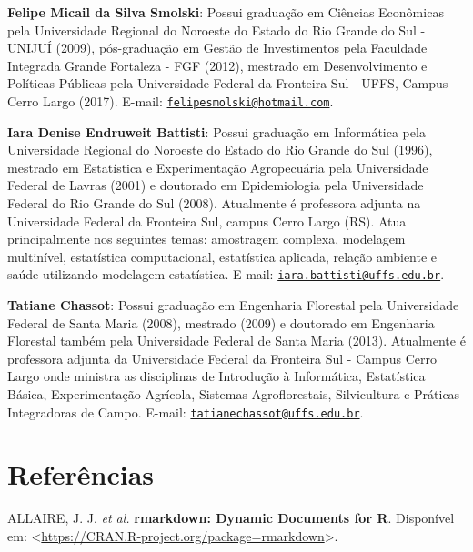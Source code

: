 \documentclass[12pt,brazil,oneside]{book}
\begin{document}
\textbf{Felipe Micail da Silva Smolski}: Possui graduação em Ciências Econômicas pela Universidade Regional do Noroeste do Estado do Rio Grande do Sul - UNIJUÍ (2009), pós-graduação em Gestão de Investimentos pela Faculdade Integrada Grande Fortaleza - FGF (2012), mestrado em Desenvolvimento e Políticas Públicas pela Universidade Federal da Fronteira Sul - UFFS, Campus Cerro Largo (2017). E-mail: \href{mailto:felipesmolski@hotmail.com}{\nolinkurl{felipesmolski@hotmail.com}}.

\textbf{Iara Denise Endruweit Battisti}: Possui graduação em Informática pela Universidade Regional do Noroeste do Estado do Rio Grande do Sul (1996), mestrado em Estatística e Experimentação Agropecuária pela Universidade Federal de Lavras (2001) e doutorado em Epidemiologia pela Universidade Federal do Rio Grande do Sul (2008). Atualmente é professora adjunta na Universidade Federal da Fronteira Sul, campus Cerro Largo (RS). Atua principalmente nos seguintes temas: amostragem complexa, modelagem multinível, estatística computacional, estatística aplicada, relação ambiente e saúde utilizando modelagem estatística. E-mail: \href{mailto:iara.battisti@uffs.edu.br}{\nolinkurl{iara.battisti@uffs.edu.br}}.

\textbf{Tatiane Chassot}: Possui graduação em Engenharia Florestal pela Universidade Federal de Santa Maria (2008), mestrado (2009) e doutorado em Engenharia Florestal também pela Universidade Federal de Santa Maria (2013). Atualmente é professora adjunta da Universidade Federal da Fronteira Sul - Campus Cerro Largo onde ministra as disciplinas de Introdução à Informática, Estatística Básica, Experimentação Agrícola, Sistemas Agroflorestais, Silvicultura e Práticas Integradoras de Campo. E-mail: \href{mailto:tatianechassot@uffs.edu.br}{\nolinkurl{tatianechassot@uffs.edu.br}}.

\setlength{\parindent}{0.0cm}

\RaggedRight

\frenchspacing

\hypertarget{referencias}{%
\chapter*{Referências}\label{referencias}}

\hypertarget{refs}{}
\leavevmode\hypertarget{ref-R-rmarkdown}{}%
ALLAIRE, J. J. \emph{et al.} \textbf{rmarkdown: Dynamic Documents for R}. Disponível em: \textless{}\url{https://CRAN.R-project.org/package=rmarkdown}\textgreater{}.
\end{document}
